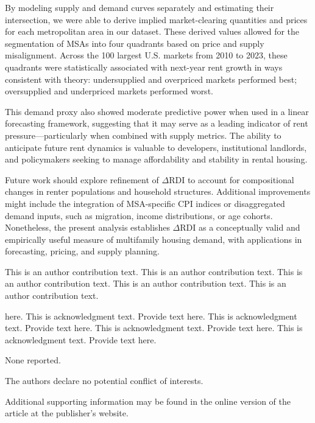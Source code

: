 \documentclass[APA,Times1COL]{WileyNJDv5} %
\begin{document}
By modeling supply and demand curves separately and estimating their intersection, we were able to derive implied market-clearing quantities and prices for each metropolitan area in our dataset. These derived values allowed for the segmentation of MSAs into four quadrants based on price and supply misalignment. Across the 100 largest U.S. markets from 2010 to 2023, these quadrants were statistically associated with next-year rent growth in ways consistent with theory: undersupplied and overpriced markets performed best; oversupplied and underpriced markets performed worst.

This demand proxy also showed moderate predictive power when used in a linear forecasting framework, suggesting that it may serve as a leading indicator of rent pressure---particularly when combined with supply metrics. The ability to anticipate future rent dynamics is valuable to developers, institutional landlords, and policymakers seeking to manage affordability and stability in rental housing.

Future work should explore refinement of \(\Delta\text{RDI}\) to account for compositional changes in renter populations and household structures. Additional improvements might include the integration of MSA-specific CPI indices or disaggregated demand inputs, such as migration, income distributions, or age cohorts. Nonetheless, the present analysis establishes \(\Delta\text{RDI}\) as a conceptually valid and empirically useful measure of multifamily housing demand, with applications in forecasting, pricing, and supply planning.


{}

This is an author contribution text. This is an author contribution text. This is an author contribution text. This is an author contribution text. This is an author contribution text.

 here. This is acknowledgment text. Provide text here. This is acknowledgment text. Provide text here. This is acknowledgment text. Provide text here. This is acknowledgment text. Provide text here.



None reported.


The authors declare no potential conflict of interests.


Additional supporting information may be found in the
online version of the article at the publisher’s website.
\end{document}
